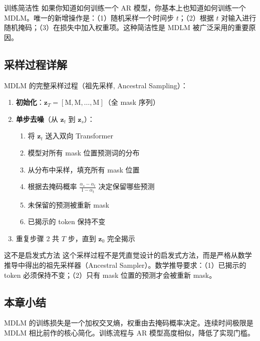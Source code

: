 \begin{knowledgebox}{训练简洁性}
如果你知道如何训练一个 AR 模型，你基本上也知道如何训练一个 MDLM。唯一的新增操作是：（1）随机采样一个时间步 $t$；（2）根据 $t$ 对输入进行随机掩码；（3）在损失中加入权重项。这种简洁性是 MDLM 被广泛采用的重要原因。
\end{knowledgebox}

\subsection{采样过程详解}

MDLM 的完整采样过程（祖先采样, Ancestral Sampling）：

\begin{enumerate}
    \item \textbf{初始化}：$\mathbf{z}_T = [\text{M}, \text{M}, \ldots, \text{M}]$（全 mask 序列）
    \item \textbf{单步去噪}（从 $\mathbf{z}_t$ 到 $\mathbf{z}_s$）：
    \begin{enumerate}
        \item 将 $\mathbf{z}_t$ 送入双向 Transformer
        \item 模型对所有 mask 位置预测词的分布
        \item 从分布中采样，填充所有 mask 位置
        \item 根据去掩码概率 $\frac{\alpha_s - \alpha_t}{1 - \alpha_t}$ 决定保留哪些预测
        \item 未保留的预测被重新 mask
        \item 已揭示的 token 保持不变
    \end{enumerate}
    \item 重复步骤 2 共 $T$ 步，直到 $\mathbf{z}_0$ 完全揭示
\end{enumerate}

\begin{warningbox}{这不是启发式方法}
这个采样过程不是凭直觉设计的启发式方法，而是严格从数学推导中得出的祖先采样器（Ancestral Sampler）。数学推导要求：（1）已揭示的 token 必须保持不变；（2）只有 mask 位置的预测才会被重新 mask。
\end{warningbox}

\subsection{本章小结}

MDLM 的训练损失是一个加权交叉熵，权重由去掩码概率决定。连续时间极限是 MDLM 相比前作的核心简化。训练流程与 AR 模型高度相似，降低了实现门槛。

\newpage
